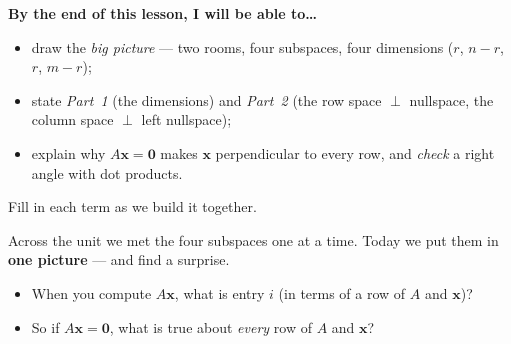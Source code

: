 \documentclass[10pt]{article}
\newcommand{\xx}{\mathbf{x}}
\newcommand{\zero}{\mathbf{0}}
\begin{document}
\namedateperiod

\vspace{0.06in}

\begin{objectivebox}
\textbf{By the end of this lesson, I will be able to\dots}
\begin{itemize}\setlength{\itemsep}{1pt}
  \item draw the \emph{big picture} --- two rooms, four subspaces, four dimensions ($r$, $n-r$, $r$, $m-r$);
  \item state \emph{Part~1} (the dimensions) and \emph{Part~2} (the row space $\perp$ nullspace, the column space $\perp$ left nullspace);
  \item explain why $A\xx=\zero$ makes $\xx$ perpendicular to every row, and \emph{check} a right angle with dot products.
\end{itemize}
\end{objectivebox}

\vspace{0.04in}

\begin{vocabbox}
\small
Fill in each term as we build it together.
\vspace{2pt}
\end{vocabbox}

\begin{hookbox}
Across the unit we met the four subspaces one at a time. Today we put them in \textbf{one picture} --- and
find a surprise.
\begin{itemize}\setlength{\itemsep}{1pt}
  \item When you compute $A\xx$, what is entry $i$ (in terms of a row of $A$ and $\xx$)? \writeline
  \item So if $A\xx=\zero$, what is true about \emph{every} row of $A$ and $\xx$? \writeline
\end{itemize}
\end{hookbox}
\end{document}
